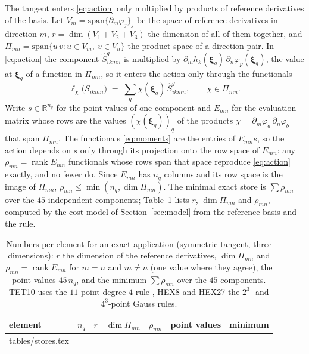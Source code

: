 \documentclass[sigconf,balance=false]{acmart}
\makeatletter
\newcommand{\rows}[1]{\@@input #1 }
\newcommand{\xhat}{\boldsymbol{\xi}}
\newcommand{\Sq}{\widehat{S}^{q}}
\makeatother
\begin{document}
The tangent enters \eqref{eq:action} only multiplied by products of reference derivatives of the
basis.  Let $V_m=\mathrm{span}\{\partial_m\varphi_j\}_j$ be the space of reference derivatives in
direction $m$, $r=\dim(V_1+V_2+V_3)$ the dimension of all of them together, and
$\Pi_{mn}=\mathrm{span}\{u\,v : u\in V_m,\ v\in V_n\}$ the product space of a direction pair.  In
\eqref{eq:action} the component $\Sq_{ikmn}$ is multiplied by $\partial_m h_k(\xhat_q)\,
\partial_n\varphi_p(\xhat_q)$, the value at $\xhat_q$ of a function in $\Pi_{mn}$, so it enters the
action only through the functionals
\begin{equation}
  \ell_\chi\bigl(S_{ikmn}\bigr) \;=\; \sum_{q} \chi(\xhat_q)\, \Sq_{ikmn} ,
  \qquad \chi \in \Pi_{mn} .
  \label{eq:moments}
\end{equation}
Write $s\in\mathbb{R}^{n_q}$ for the point values of one component and $E_{mn}$ for the evaluation
matrix whose rows are the values $(\chi(\xhat_q))_q$ of the products
$\chi=\partial_m\varphi_a\,\partial_n\varphi_b$ that span $\Pi_{mn}$.  The functionals
\eqref{eq:moments} are the entries of $E_{mn}s$, so the action depends on $s$ only through its
projection onto the row space of $E_{mn}$: any $\rho_{mn}=\operatorname{rank}E_{mn}$ functionals whose
rows span that space reproduce \eqref{eq:action} exactly, and no fewer do.  Since $E_{mn}$ has $n_q$
columns and its row space is the image of $\Pi_{mn}$, $\rho_{mn}\le\min(n_q,\dim\Pi_{mn})$.  The
minimal exact store is $\sum\rho_{mn}$ over the $45$ independent components; Table~\ref{tab:stores}
lists $r$, $\dim\Pi_{mn}$ and $\rho_{mn}$, computed by the cost model of Section~\ref{sec:model} from
the reference basis and the rule.

\begin{table}[t]
\centering
\begin{tabular}{lrrrrrr}
\toprule
element & $n_q$ & $r$ & $\dim\Pi_{mn}$ & $\rho_{mn}$ & point values & minimum \\
\midrule
\rows{tables/stores.tex}
\bottomrule
\end{tabular}
\caption{Numbers per element for an exact application (symmetric tangent, three dimensions): $r$
the dimension of the reference derivatives, $\dim\Pi_{mn}$ and $\rho_{mn}=\operatorname{rank}E_{mn}$
for $m=n$ and $m\ne n$ (one value where they agree), the point values $45\,n_q$, and the minimum
$\sum\rho_{mn}$ over the $45$ components.  TET10 uses the $11$-point degree-$4$ rule
\cite{Keast1986}, HEX8 and HEX27 the $2^3$- and $4^3$-point Gauss rules.}
\label{tab:stores}
\end{table}
\end{document}
